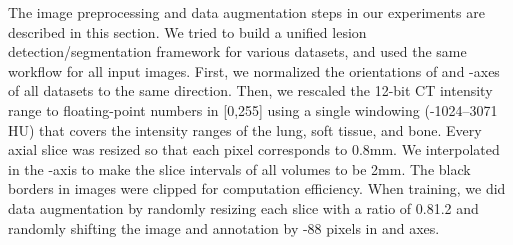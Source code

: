 \documentclass[runningheads]{llncs}
\begin{document}
The image preprocessing and data augmentation steps in our experiments are described in this section. We tried to build a unified lesion detection/segmentation framework for various datasets, and used the same workflow for all input images. First, we normalized the orientations of  and -axes of all datasets to the same direction. Then, we rescaled the 12-bit CT intensity range to floating-point numbers in [0,255] using a single windowing (-1024--3071 HU) that covers the intensity ranges of the lung, soft tissue, and bone. Every axial slice was resized so that each pixel corresponds to 0.8mm. We interpolated in the -axis to make the slice intervals of all volumes to be 2mm. The black borders in images were clipped for computation efficiency. When training, we did data augmentation by randomly resizing each slice with a ratio of 0.81.2 and randomly shifting the image and annotation by -88 pixels in  and  axes.


\clearpage


\end{document}
